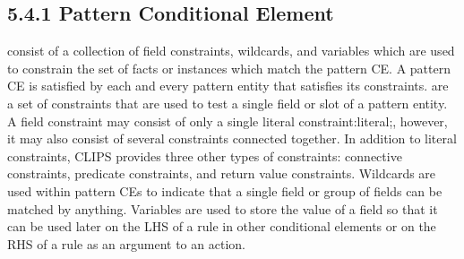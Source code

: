 \documentclass[letterpaper,10pt,english]{sphinxmanual}
\begin{document}

\begin{sphinxVerbatim}[commandchars=\\\{\}]
   
   
   
   
   
   
   
   
\end{sphinxVerbatim}


\subsection{5.4.1 Pattern Conditional Element}
\label{\detokenize{defrule:pattern-conditional-element}}
 consist of a collection of field
constraints, wildcards, and variables which are used to constrain the
set of facts or instances which match the pattern CE. A pattern CE is
satisfied by each and every pattern entity that satisfies its
constraints.  are a set of constraints that are
used to test a single field or slot of a pattern entity. A field
constraint may consist of only a single literal constraint:literal;,
however, it may also consist of several constraints connected together.
In addition to literal constraints, CLIPS provides three other types of
constraints: connective constraints, predicate constraints, and return
value constraints. Wildcards are used within pattern CEs to indicate
that a single field or group of fields can be matched by anything.
Variables are used to store the value of a field so that it can be used
later on the LHS of a rule in other conditional elements or on the RHS
of a rule as an argument to an action.
\end{document}
